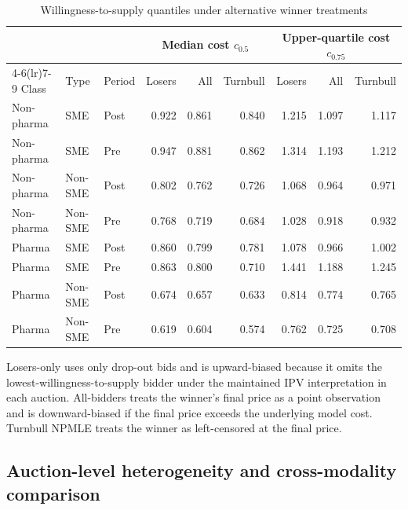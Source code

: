 \documentclass[12pt]{article}
\begin{document}
\begin{table}[!htbp]
\centering
\begin{threeparttable}
\caption{Willingness-to-supply quantiles under alternative winner treatments}
\label{tab:app_turnbull_quantiles}
\scriptsize
\setlength{\tabcolsep}{3pt}
\begin{tabular}{lllrrrrrr}
\toprule
 & & & \multicolumn{3}{c}{Median cost \(c_{0.5}\)} & \multicolumn{3}{c}{Upper-quartile cost \(c_{0.75}\)} \\
\cmidrule(lr){4-6}\cmidrule(lr){7-9}
Class & Type & Period & Losers & All & Turnbull & Losers & All & Turnbull \\
\midrule
Non-pharma & SME & Post & 0.922 & 0.861 & 0.840 & 1.215 & 1.097 & 1.117 \\
Non-pharma & SME & Pre & 0.947 & 0.881 & 0.862 & 1.314 & 1.193 & 1.212 \\
Non-pharma & Non-SME & Post & 0.802 & 0.762 & 0.726 & 1.068 & 0.964 & 0.971 \\
Non-pharma & Non-SME & Pre & 0.768 & 0.719 & 0.684 & 1.028 & 0.918 & 0.932 \\
Pharma & SME & Post & 0.860 & 0.799 & 0.781 & 1.078 & 0.966 & 1.002 \\
Pharma & SME & Pre & 0.863 & 0.800 & 0.710 & 1.441 & 1.188 & 1.245 \\
Pharma & Non-SME & Post & 0.674 & 0.657 & 0.633 & 0.814 & 0.774 & 0.765 \\
Pharma & Non-SME & Pre & 0.619 & 0.604 & 0.574 & 0.762 & 0.725 & 0.708 \\
\bottomrule
\end{tabular}
\begin{tablenotes}\footnotesize
\item Losers-only uses only drop-out bids and is upward-biased because it
omits the lowest-willingness-to-supply bidder under the maintained IPV
interpretation in each auction. All-bidders treats the winner's final
price as a point observation and is downward-biased if the final price
exceeds the underlying model cost. Turnbull NPMLE treats the winner as
left-censored at the final price.
\end{tablenotes}
\end{threeparttable}
\end{table}

\subsection{Auction-level heterogeneity and cross-modality comparison}
\end{document}
